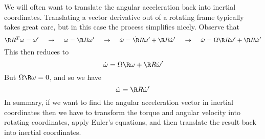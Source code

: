 We will often want to translate the angular acceleration back into inertial
coordinates. Translating a vector derivative out of a rotating frame typically
takes great care, but in this case the process simplifies nicely. Observe that
$$
\R R^T\omega = \omega' 
\hskip12pt\to\hskip12pt
\omega = \R R\omega'
\hskip12pt\to\hskip12pt
\dot\omega = \dot \R R\omega' + \R R\dot\omega'
\hskip12pt\to\hskip12pt
\dot\omega = \Omega\R R\omega' + \R R\dot\omega'
$$
This then reduces to
$$
\dot\omega = \Omega\R\omega + \R R\dot\omega'
$$
But $\Omega\R\omega = 0$, and so we have
$$
\dot\omega = \R R\dot\omega'
$$
In summary, if we want to find the angular acceleration vector in inertial
coordinates then we have to transform the torque and angular velocity into
rotating coordinates, apply Euler's equations, and then translate the result
back into inertial coordinates.

\bye


